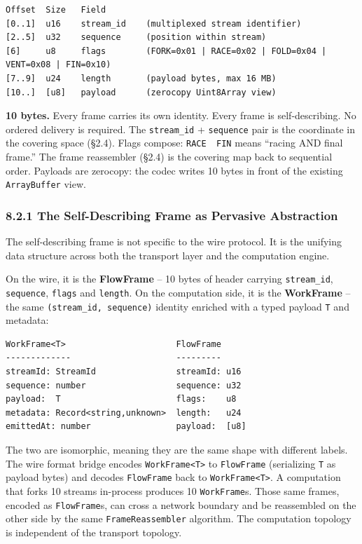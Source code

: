 \documentclass[
  11pt,
]{article}
\begin{document}
\begin{verbatim}
Offset  Size   Field
[0..1]  u16    stream_id    (multiplexed stream identifier)
[2..5]  u32    sequence     (position within stream)
[6]     u8     flags        (FORK=0x01 | RACE=0x02 | FOLD=0x04 | VENT=0x08 | FIN=0x10)
[7..9]  u24    length       (payload bytes, max 16 MB)
[10..]  [u8]   payload      (zerocopy Uint8Array view)
\end{verbatim}

\textbf{10 bytes.} Every frame carries its own identity. Every frame is
self-describing. No ordered delivery is required. The
\texttt{stream\_id} + \texttt{sequence} pair is the coordinate in the
covering space (§2.4). Flags compose: \texttt{RACE\ \ FIN} means
``racing AND final frame.'' The frame reassembler (§2.4) is the covering
map back to sequential order. Payloads are zerocopy: the codec writes 10
bytes in front of the existing \texttt{ArrayBuffer} view.

\subsubsection{8.2.1 The Self-Describing Frame as Pervasive
Abstraction}\label{the-self-describing-frame-as-pervasive-abstraction}

The self-describing frame is not specific to the wire protocol. It is
the unifying data structure across both the transport layer and the
computation engine.

On the wire, it is the \textbf{FlowFrame} -- 10 bytes of header carrying
\texttt{stream\_id}, \texttt{sequence}, \texttt{flags} and
\texttt{length}. On the computation side, it is the \textbf{WorkFrame}
-- the same \texttt{(stream\_id,\ sequence)} identity enriched with a
typed payload \texttt{T} and metadata:

\begin{verbatim}
WorkFrame<T>                      FlowFrame
-------------                     ---------
streamId: StreamId                streamId: u16
sequence: number                  sequence: u32
payload:  T                       flags:    u8
metadata: Record<string,unknown>  length:   u24
emittedAt: number                 payload:  [u8]
\end{verbatim}

The two are isomorphic, meaning they are the same shape with different
labels. The wire format bridge encodes
\texttt{WorkFrame\textless{}T\textgreater{}} to \texttt{FlowFrame}
(serializing \texttt{T} as payload bytes) and decodes \texttt{FlowFrame}
back to \texttt{WorkFrame\textless{}T\textgreater{}}. A computation that
forks 10 streams in-process produces 10 \texttt{WorkFrame}s. Those same
frames, encoded as \texttt{FlowFrame}s, can cross a network boundary and
be reassembled on the other side by the same \texttt{FrameReassembler}
algorithm. The computation topology is independent of the transport
topology.
\end{document}

